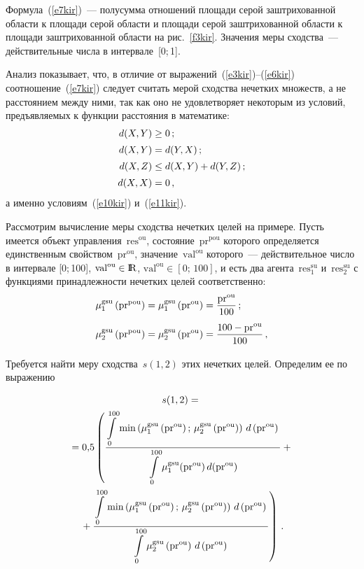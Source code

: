 \begin{multicols}{2}
  
  Формула~(\ref{e7kir})~--- полусумма отношений площади серой 
заштрихованной области к площади серой области и площади серой 
заштрихованной об\-ласти к площади заштрихованной области на 
рис.~\ref{f3kir}. Значения меры сходства~--- действительные числа в 
интервале~[0;\,1].
  
 
  Анализ показывает, что, в отличие от выражений~(\ref{e3kir})--(\ref{e6kir}) 
соотношение~(\ref{e7kir}) следует считать мерой сходства нечетких множеств, 
а не расстоянием между ними, так как оно не удовлетворяет некоторым из 
условий, предъявляемых к функции расстояния в математике:
  \begin{align}
  d (X,Y) &\geq 0\,; \notag\\[2pt]
  d(X,Y) & =d(Y,X)\,;\notag\\[2pt]
  d(X,Z) &\leq d(X,Y)+d(Y,Z)\,;\label{e10kir}\\[2pt]
  d(X,X) & =0\,,\label{e11kir}
  \end{align}
а именно условиям~(\ref{e10kir}) и~(\ref{e11kir}).

  Рассмотрим вычисление меры сходства нечетких целей на примере. Пусть 
имеется объект управ\-ле\-ния~$\mathrm{res}^{\mathrm{ou}}$, состояние~$\mathrm{pr}^{\mathrm{pou}}$ которого 
определяется единственным свойством~$\mathrm{pr}^{\mathrm{ou}}$, значение~$\mathrm{val}^{\mathrm{ou}}$ 
которого~--- действительное число в интервале [0;\,100], $\mathrm{val}^{\mathrm{ou}}\in {\rm I\hspace{-0.7mm}\rm R}$, 
$\mathrm{val}^{\mathrm{ou}}\in [0;\,100]$, и есть два агента~$\mathrm{res}_1^{\mathrm{su}}$ и~$\mathrm{res}_2^{\mathrm{su}}$ с 
функциями принадлежности нечетких целей 
соответственно:
  \begin{align*}
  \mu_1^{\mathrm{gsu}}\left(\mathrm{pr}^{\mathrm{pou}}\right) &=\mu_1^{\mathrm{gsu}}\left(\mathrm{pr}^{\mathrm{ou}}\right) = 
\fr{\mathrm{pr}^{\mathrm{ou}}}{100}\,;\\[2pt]
  \mu_2^{\mathrm{gsu}}\left(\mathrm{pr}^{\mathrm{pou}}\right ) &=\mu_2^{\mathrm{gsu}}\left(\mathrm{pr}^{\mathrm{ou}}\right) = \fr{100- 
\mathrm{pr}^{\mathrm{ou}}}{100}\,, %
  \end{align*}
  
  Требуется найти меру сходства~$s (1,2)$ этих нечетких целей. Определим ее 
по выражению

\noindent
  \begin{multline}
  s(1,2) ={}\\
  {}= 0{,}5\left (\displaystyle\frac{\displaystyle \int\limits_0^{100} \min \left ( 
\mu_1^{\mathrm{gsu}}\left(\mathrm{pr}^{\mathrm{ou}}\right);\,\mu_2^{\mathrm{gsu}}\left(\mathrm{pr}^{\mathrm{ou}}\right)\right )\,
d\left(\mathrm{pr}^{\mathrm{ou}}\right)\mathstrut}{\displaystyle \int\limits_0^{100} 
\mu_1^{\mathrm{gsu}}(\mathrm{pr}^{\mathrm{ou}})\,d(\mathrm{pr}^{\mathrm{ou}})\mathstrut}+{}\right.\\
\!\!\left.{}+\displaystyle\frac{\displaystyle \int\limits_0^{100} \min \left ( 
\mu_1^{\mathrm{gsu}}\left(\mathrm{pr}^{\mathrm{ou}}\right);\,\mu_2^{\mathrm{gsu}}\left(\mathrm{pr}^{\mathrm{ou}}\right)\right )\, 
d\left(\mathrm{pr}^{\mathrm{ou}}\right)\mathstrut}{\displaystyle \int\limits_0^{100} 
\mu_2^{\mathrm{gsu}}\left(\mathrm{pr}^{\mathrm{ou}}\right)\,d\left(\mathrm{pr}^{\mathrm{ou}}\right)\mathstrut}\right )\,.\!\!
  \label{e14kir}
  \end{multline}
  

\end{multicols}
